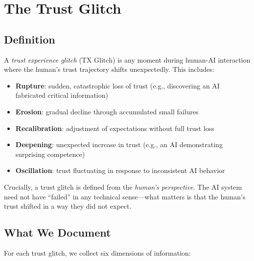 \documentclass[11pt,a4paper]{article}
\begin{document}
\section{The Trust Glitch}

\subsection{Definition}

A \textit{trust experience glitch} (TX Glitch) is any moment during human-AI interaction where the human's trust trajectory shifts unexpectedly. This includes:

\begin{itemize}[noitemsep]
    \item \textbf{Rupture}: sudden, catastrophic loss of trust (e.g., discovering an AI fabricated critical information)
    \item \textbf{Erosion}: gradual decline through accumulated small failures
    \item \textbf{Recalibration}: adjustment of expectations without full trust loss
    \item \textbf{Deepening}: unexpected increase in trust (e.g., an AI demonstrating surprising competence)
    \item \textbf{Oscillation}: trust fluctuating in response to inconsistent AI behavior
\end{itemize}

Crucially, a trust glitch is defined from the \textit{human's perspective}. The AI system need not have ``failed'' in any technical sense---what matters is that the human's trust shifted in a way they did not expect.

\subsection{What We Document}

For each trust glitch, we collect six dimensions of information:
\end{document}
